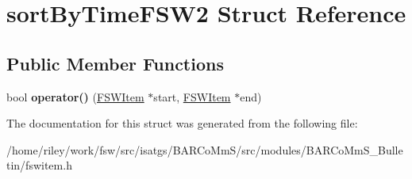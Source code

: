 \hypertarget{structsort_by_time_f_s_w2}{}\section{sort\+By\+Time\+F\+S\+W2 Struct Reference}
\label{structsort_by_time_f_s_w2}
\subsection*{Public Member Functions}
\begin{DoxyCompactItemize}
\item 
bool {\bfseries operator()} (\hyperlink{class_f_s_w_item}{F\+S\+W\+Item} $\ast$start, \hyperlink{class_f_s_w_item}{F\+S\+W\+Item} $\ast$end)\hypertarget{structsort_by_time_f_s_w2_a1d236f3f61e7a10b8de3d272152abbff}{}\label{structsort_by_time_f_s_w2_a1d236f3f61e7a10b8de3d272152abbff}

\end{DoxyCompactItemize}


The documentation for this struct was generated from the following file\+:\begin{DoxyCompactItemize}
\item 
/home/riley/work/fsw/src/isatgs/\+B\+A\+R\+Co\+Mm\+S/src/modules/\+B\+A\+R\+Co\+Mm\+S\+\_\+\+Bulletin/fswitem.\+h\end{DoxyCompactItemize}
